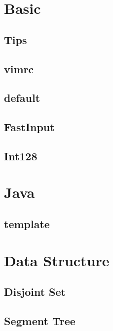 \documentclass[a4paper,10pt,twocolumn,oneside]{article}
\begin{document}
\pagestyle{fancy}
\fancyfoot{}
\fancyhead[R]{\thepage}
\renewcommand{\headrulewidth}{0.4pt}
\renewcommand{\contentsname}{Contents}

\scriptsize
\tableofcontents

\newpage

\section{Basic}
\subsection{Tips}

\subsection{vimrc}

\subsection{default}

\subsection{FastInput}

\subsection{Int128}


\section{Java}
\subsection{template}


\section{Data Structure}
\subsection{Disjoint Set}

\subsection{Segment Tree}

\end{document}
